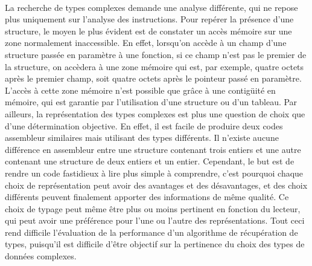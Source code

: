 \documentclass[a4paper,12pt]{article}
\begin{document}
\paragraph{}
La recherche de types complexes demande une analyse différente, qui ne repose
plus uniquement sur l'analyse des instructions. Pour repérer la présence
d'une structure, le moyen le plus évident est de constater un accès mémoire
sur une zone normalement inaccessible. En effet, lorsqu'on accède à un
champ d'une structure passée en paramètre à une fonction, si ce champ n'est
pas le premier de la structure, on accèdera à une zone mémoire qui est,
par exemple, quatre octets après le premier champ, soit quatre octets après
le pointeur passé en paramètre. L'accès à cette zone mémoire n'est 
possible que grâce à une contigüité en mémoire, qui est garantie par
l'utilisation d'une structure ou d'un tableau. Par ailleurs, la
représentation des types complexes est plus une question de choix que
d'une détermination objective. En effet, il est facile de produire deux
codes assembleur similaires mais utilisant des types différents. Il n'existe
aucune différence en assembleur entre une structure contenant trois entiers
et une autre contenant une structure de deux entiers et un entier. 
Cependant, le but est de rendre un code fastidieux à lire plus simple à
comprendre, c'est pourquoi chaque choix de représentation peut avoir des
avantages et des désavantages, et des choix différents peuvent finalement
 apporter des
informations de même qualité. Ce choix de typage peut même être plus ou
moins pertinent en fonction du lecteur, qui peut avoir une préférence pour
l'une ou l'autre des représentations. Tout ceci rend difficile l'évaluation
de la performance d'un algorithme de récupération de types, puisqu'il est
difficile d'être objectif sur la pertinence du choix des types de données
complexes.
\end{document}
